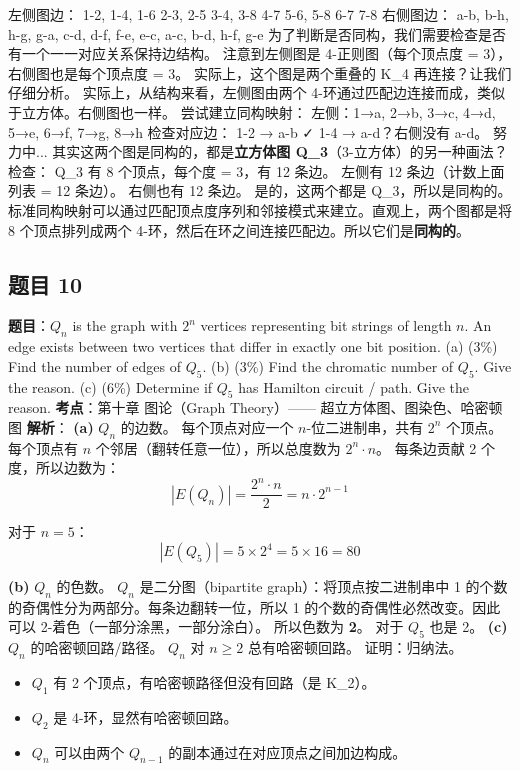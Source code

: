 \documentclass[10pt,a4paper,openany]{ctexbook}
\theoremstyle{definition}
\theoremstyle{remark}
\begin{document}
左侧图边：
1-2, 1-4, 1-6
2-3, 2-5
3-4, 3-8
4-7
5-6, 5-8
6-7
7-8
右侧图边：
a-b, b-h, h-g, g-a, c-d, d-f, f-e, e-c, a-c, b-d, h-f, g-e
为了判断是否同构，我们需要检查是否有一个一一对应关系保持边结构。
注意到左侧图是 4-正则图（每个顶点度 = 3），右侧图也是每个顶点度 = 3。
实际上，这个图是两个重叠的 K\_{4} 再连接？让我们仔细分析。
实际上，从结构来看，左侧图由两个 4-环通过匹配边连接而成，类似于立方体。右侧图也一样。
尝试建立同构映射：
左侧：1→a, 2→b, 3→c, 4→d, 5→e, 6→f, 7→g, 8→h
检查对应边：
1-2 → a-b ✓
1-4 → a-d？右侧没有 a-d。
努力中...
其实这两个图是同构的，都是\textbf{立方体图 Q\_3}（3-立方体）的另一种画法？检查：
Q\_3 有 8 个顶点，每个度 = 3，有 12 条边。
左侧有 12 条边（计数上面列表 = 12 条边）。
右侧也有 12 条边。
是的，这两个都是 Q\_3，所以是同构的。
标准同构映射可以通过匹配顶点度序列和邻接模式来建立。直观上，两个图都是将 8 个顶点排列成两个 4-环，然后在环之间连接匹配边。所以它们是\textbf{同构的}。
\vspace{-2pt}

\subsection{题目 10}

\textbf{题目}：$Q_n$ is the graph with $2^n$ vertices representing bit strings of length $n$. An edge exists between two vertices that differ in exactly one bit position.
(a) (3\%) Find the number of edges of $Q_5$.
(b) (3\%) Find the chromatic number of $Q_5$. Give the reason.
(c) (6\%) Determine if $Q_5$ has Hamilton circuit / path. Give the reason.
\textbf{考点}：第十章 图论（Graph Theory）—— 超立方体图、图染色、哈密顿图
\textbf{解析}：
\textbf{(a)} $Q_n$ 的边数。
每个顶点对应一个 $n$-位二进制串，共有 $2^n$ 个顶点。
每个顶点有 $n$ 个邻居（翻转任意一位），所以总度数为 $2^n \cdot n$。
每条边贡献 2 个度，所以边数为：
\[
|E(Q_n)| = \frac{2^n \cdot n}{2} = n \cdot 2^{n-1}
\]

对于 $n = 5$：
\[
|E(Q_5)| = 5 \times 2^{4} = 5 \times 16 = 80
\]

\textbf{(b)} $Q_n$ 的色数。
$Q_n$ 是二分图（bipartite graph）：将顶点按二进制串中 1 的个数的奇偶性分为两部分。每条边翻转一位，所以 1 的个数的奇偶性必然改变。因此可以 2-着色（一部分涂黑，一部分涂白）。
所以色数为 \textbf{2}。
对于 $Q_5$ 也是 2。
\textbf{(c)} $Q_n$ 的哈密顿回路/路径。
$Q_n$ 对 $n \geq 2$ 总有哈密顿回路。
证明：归纳法。
\begin{itemize}
\item $Q_1$ 有 2 个顶点，有哈密顿路径但没有回路（是 K\_2）。
\item $Q_2$ 是 4-环，显然有哈密顿回路。
\item $Q_n$ 可以由两个 $Q_{n-1}$ 的副本通过在对应顶点之间加边构成。

\end{itemize}
\end{document}
